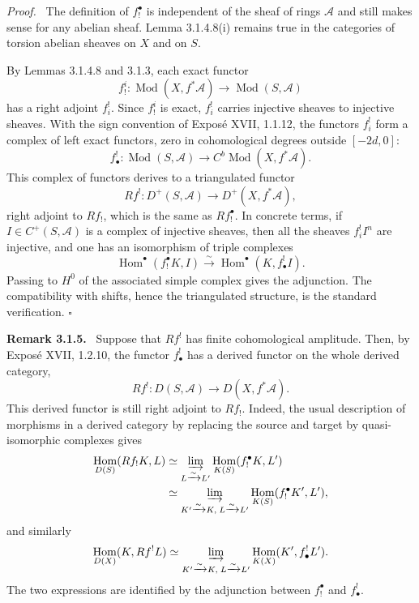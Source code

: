 \documentclass[12pt]{article}
\newcommand{\Aa}{\mathcal A}
\DeclareMathOperator{\Hom}{Hom}
\DeclareMathOperator{\Mod}{Mod}
\newcommand{\qedtext}{\hfill\(\square\)}
\newenvironment{remarktext}[1]{\par\medskip\noindent\textbf{#1.}\ }{\par\medskip}
\newenvironment{prooftext}[1][Proof]{\par\noindent\emph{#1.}\ }{\par\medskip}
\begin{document}
\begin{prooftext}
The definition of $f_!^{\bullet}$ is independent of the sheaf of rings $\Aa$ and still makes sense for any abelian sheaf. Lemma 3.1.4.8(i) remains true in the categories of torsion abelian sheaves on $X$ and on $S$.

By Lemmas 3.1.4.8 and 3.1.3, each exact functor
\[
   f_!^i:\Mod(X,f^*\Aa)\longrightarrow \Mod(S,\Aa)
\]
has a right adjoint $f_i^!$. Since $f_!^i$ is exact, $f_i^!$ carries injective sheaves to injective sheaves. With the sign convention of Expos\'e XVII, 1.1.12, the functors $f_i^!$ form a complex of left exact functors, zero in cohomological degrees outside $[-2d,0]$:
\begin{equation}
   f^!_{\bullet}:\Mod(S,\Aa)\longrightarrow C^b\Mod(X,f^*\Aa). \tag{3.1.4.10}
\end{equation}
This complex of functors derives to a triangulated functor
\begin{equation}
   Rf^!:D^+(S,\Aa)\longrightarrow D^+(X,f^*\Aa), \tag{3.1.4.11}
\end{equation}
right adjoint to $Rf_!$, which is the same as $Rf_!^{\bullet}$. In concrete terms, if $I\in C^+(S,\Aa)$ is a complex of injective sheaves, then all the sheaves $f_i^!I^n$ are injective, and one has an isomorphism of triple complexes
\begin{equation}
   \Hom^{\bullet}(f_!^{\bullet}K,I)\xrightarrow{\sim}
   \Hom^{\bullet}(K,f^!_{\bullet}I). \tag{3.1.4.12}
\end{equation}
Passing to $H^0$ of the associated simple complex gives the adjunction. The compatibility with shifts, hence the triangulated structure, is the standard verification. \qedtext
\end{prooftext}

\begin{remarktext}{Remark 3.1.5}
Suppose that $Rf^!$ has finite cohomological amplitude. Then, by Expos\'e XVII, 1.2.10, the functor $f^!_{\bullet}$ has a derived functor on the whole derived category,
\begin{equation}
   Rf^!:D(S,\Aa)\longrightarrow D(X,f^*\Aa). \tag{3.1.5.1}
\end{equation}
This derived functor is still right adjoint to $Rf_!$. Indeed, the usual description of morphisms in a derived category by replacing the source and target by quasi-isomorphic complexes gives
\begin{align*}
\Hom_{D(S)}(Rf_!K,L)&\simeq
 \varinjlim_{L\xrightarrow{\sim}L'}\Hom_{K(S)}(f_!^{\bullet}K,L')\\
&\simeq \varinjlim_{K'\xrightarrow{\sim}K,\;L\xrightarrow{\sim}L'}
\Hom_{K(S)}(f_!^{\bullet}K',L'),
\end{align*}
and similarly
\[
\Hom_{D(X)}(K,Rf^!L)
 \simeq \varinjlim_{K'\xrightarrow{\sim}K,\;L\xrightarrow{\sim}L'}
\Hom_{K(X)}(K',f^!_{\bullet}L').
\]
The two expressions are identified by the adjunction between $f_!^{\bullet}$ and $f^!_{\bullet}$.
\end{remarktext}
\end{document}
